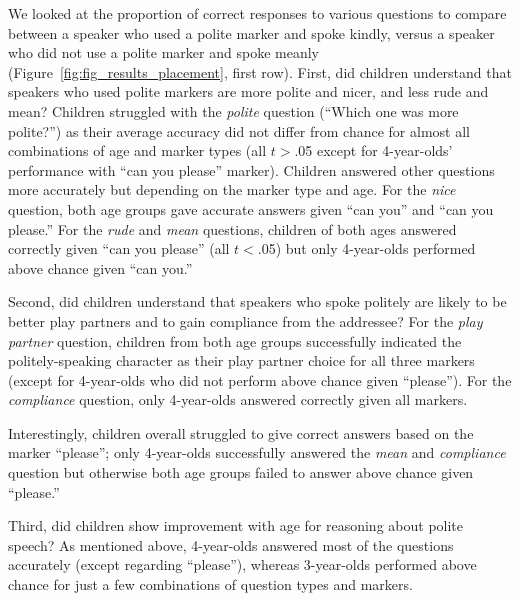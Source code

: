 \documentclass[10pt, letterpaper]{article}
\begin{document}
We looked at the proportion of correct responses to various questions to
compare between a speaker who used a polite marker and spoke kindly,
versus a speaker who did not use a polite marker and spoke meanly
(Figure~\ref{fig:fig_results_placement}, first row). First, did children
understand that speakers who used polite markers are more polite and
nicer, and less rude and mean? Children struggled with the \emph{polite}
question (``Which one was more polite?'') as their average accuracy did
not differ from chance for almost all combinations of age and marker
types (all \(t>\).05 except for 4-year-olds' performance with ``can you
please'' marker). Children answered other questions more accurately but
depending on the marker type and age. For the \emph{nice} question, both
age groups gave accurate answers given ``can you'' and ``can you
please.'' For the \emph{rude} and \emph{mean} questions, children of
both ages answered correctly given ``can you please'' (all \(t<\).05)
but only 4-year-olds performed above chance given ``can you.''

Second, did children understand that speakers who spoke politely are
likely to be better play partners and to gain compliance from the
addressee? For the \emph{play partner} question, children from both age
groups successfully indicated the politely-speaking character as their
play partner choice for all three markers (except for 4-year-olds who
did not perform above chance given ``please''). For the
\emph{compliance} question, only 4-year-olds answered correctly given
all markers.

Interestingly, children overall struggled to give correct answers based
on the marker ``please''; only 4-year-olds successfully answered the
\emph{mean} and \emph{compliance} question but otherwise both age groups
failed to answer above chance given ``please.''

Third, did children show improvement with age for reasoning about polite
speech? As mentioned above, 4-year-olds answered most of the questions
accurately (except regarding ``please''), whereas 3-year-olds performed
above chance for just a few combinations of question types and markers.
\end{document}
